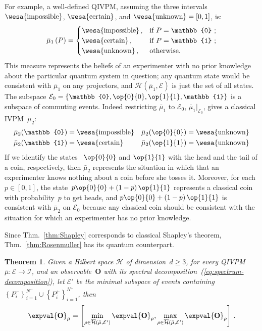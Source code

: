 \documentclass[english,reprint, aps, prl,superscriptaddress, showpacs,
showkeys, longbibliography, amsmath, amssymb]{revtex4-1}
\theoremstyle{plain}
\newtheorem{thm}{Theorem}
\theoremstyle{definition}
\newcommand{\Hilb}{\mathcal{H}}
\newcommand{\events}{\ensuremath{\mathcal{E}}}
\newcommand{\imposs}{{\text{\wesa{impossible}}}}
\newcommand{\necess}{{\text{\wesa{certain}}}}
\newcommand{\unknown}{{\text{\wesa{unknown}}}}
\newcommand{\proj}[1]{\op{#1}{#1}}
\newcommand{\coreBorn}{\ensuremath{\overline{\Hilb}}}
\begin{document}
For example, a well-defined  
QIVPM, assuming the three intervals $\imposs$, $\necess$, and
$\unknown=\left[0,1\right]$, is:
\begin{equation}
\bar{\mu}_{1}\left(P\right)=\begin{cases}
\imposs\,, & \text{if }P=\mathbb{0}\text{ ;}\\
\necess\,, & \text{if }P=\mathbb{1}\text{ ;}\\
\unknown\,, & \text{otherwise.}
\end{cases}\label{eq:no-information-IVPM}
\end{equation}
This measure represents the beliefs of an experimenter with no prior
knowledge about the particular quantum system in question; any quantum
state would be consistent with $\bar{\mu}_{1}$ on any projectors, and
$\coreBorn\left(\bar{\mu}_{1},\events\right)$ is just the set of all
states. The subspace
$\events_{0}=\left\{ \mathbb{0},\proj{0},\proj{1},\mathbb{1}\right\} $
is a subspace of commuting events. Indeed restricting $\bar{\mu}_{1}$
to $\events_{0}$, $\bar{\mu}_{1}|_{\events_{0}}$, gives a classical
IVPM~$\bar{\mu}_{2}$:
\begin{equation}
\begin{aligned}\bar{\mu}_{2}(\mathbb{0}) & =\imposs & \bar{\mu}_{2}(\proj{0}) & =\unknown\\
\bar{\mu}_{2}(\mathbb{1}) & =\necess & \bar{\mu}_{2}(\proj{1}) & =\unknown
\end{aligned}
\end{equation}
If we identify the states ~$\proj{0}$ and $\proj{1}$ with the head
and the tail of a coin, respectively, then $\bar{\mu}_{2}$ represents
the situation in which that an experimenter knows nothing about a coin
before she tosses it. Moreover, for each $p\in\left[0,1\right]$, the
state~$p\proj{0}+\left(1-p\right)\proj{1}$ represents a classical
coin with probability~$p$ to get heads, and
$p\proj{0}+\left(1-p\right)\proj{1}$ is consistent with
$\bar{\mu}_{2}$ on $\events_{0}$ because any classical coin should be
consistent with the situation for which an experimenter has no prior
knowledge.

Since Thm.~\ref{thm:Shapley} corresponds to classical Shapley's
theorem, Thm.~\ref{thm:Rosenmuller} has its quantum counterpart.

\begin{thm} Given a Hilbert space $\Hilb$ of dimension~$d\ge3$,
for every QIVPM~$\bar{\mu}:\events\rightarrow\mathscr{I}$, and an
observable~$\mathbf{O}$ with its spectral decomposition~(\ref{eq:spectrum-decomposition}),
let $\events'$ be the minimal subspace of events containing $\left\{ P_{i}^{-}\right\} _{i=1}^{N^{-}}\cup\left\{ P_{i}^{+}\right\} _{i=1}^{N^{+}}$,
then 
\begin{equation}
\expval{\mathbf{O}}_{\bar{\mu}}=\left[\min_{\rho\in\coreBorn\left(\bar{\mu},\events'\right)}\expval{\mathbf{O}}_{\rho},\max_{\rho\in\coreBorn\left(\bar{\mu},\events'\right)}\expval{\mathbf{O}}_{\rho}\right]\,.\label{eq:quantum-interval-expectation-core}
\end{equation}
\end{thm}
\end{document}
